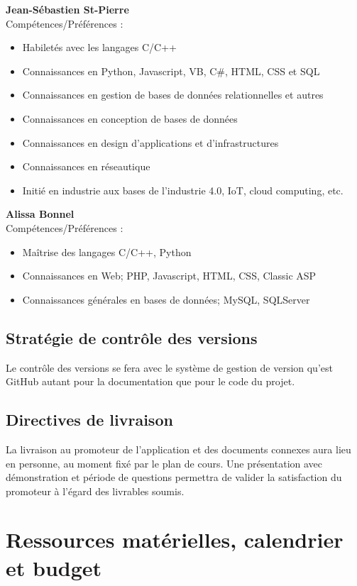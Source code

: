 \documentclass[12pt]{article}
\begin{document}
\noindent \textbf{Jean-Sébastien St-Pierre} \\
Compétences/Préférences :
\begin{itemize}
    \item Habiletés avec les langages C/C++
    \item Connaissances en Python, Javascript, VB, C\#, HTML, CSS et SQL
    \item Connaissances en  gestion de bases de données relationnelles et autres
    \item Connaissances en conception de bases de données
    \item Connaissances en design d'applications et d'infrastructures
    \item Connaissances en réseautique
    \item Initié en industrie aux bases de l’industrie 4.0, IoT, cloud
    computing, etc. \\
\end{itemize}

\noindent \textbf{Alissa Bonnel} \\
Compétences/Préférences :
\begin{itemize}
    \item Maîtrise des langages C/C++, Python
    \item Connaissances en Web; PHP, Javascript, HTML, CSS, Classic ASP
    \item Connaissances générales en bases de données; MySQL, SQLServer
\end{itemize}

\subsection{Stratégie de contrôle des versions}

Le contrôle des versions se fera avec le système de gestion de version qu'est GitHub autant
pour la documentation que pour le code du projet.

\subsection{Directives de livraison}
La livraison au promoteur de l'application et des documents connexes aura lieu en personne, au moment fixé par le plan de cours.  Une présentation avec démonstration et période de questions permettra de valider la satisfaction du promoteur à l'égard des livrables soumis.

\newpage

\section{Ressources matérielles, calendrier et budget}
\end{document}
